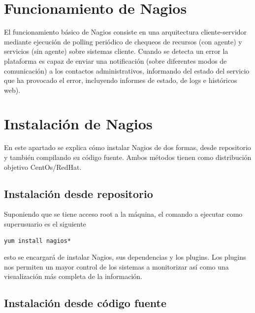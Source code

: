 \documentclass[11pt,a4paper]{article}
\begin{document}
    
\section{Funcionamiento de Nagios}


El funcionamiento básico de Nagios consiste en una arquitectura cliente-servidor mediante ejecución de polling periódico de chequeos de recursos (con agente) y servicios (sin agente) sobre sistemas cliente. Cuando se detecta un error la plataforma es capaz de enviar una notificación (sobre diferentes modos de comunicación) a los contactos administrativos, informando del estado del servicio que ha provocado el error, incluyendo informes de estado, de logs e históricos web).



\section{Instalación de Nagios}

En este apartado se explica cómo instalar Nagios de dos formas, desde repositorio y también compilando su código fuente. Ambos métodos tienen como distribución objetivo CentOs/RedHat.

\subsection{Instalación desde repositorio}

Suponiendo que se tiene acceso root a la máquina, el comando a ejecutar como superusuario es el siguiente

\begin{verbatim}
yum install nagios*
\end{verbatim}

esto se encargará de instalar Nagios, sus dependencias y los plugins. Los plugins nos permiten un mayor control de los sistemas a monitorizar así como una visualización más completa de la información.

\subsection{Instalación desde código fuente}
\end{document}
